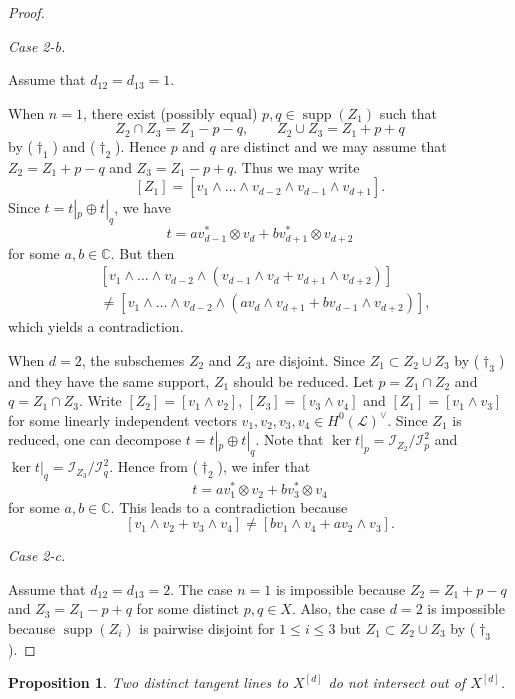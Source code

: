\documentclass[a4paper]{amsart}
\numberwithin{equation}{section}
\theoremstyle{plain}
\newtheorem{prop}[thm]{Proposition}
\theoremstyle{definition}
\theoremstyle{remark}
\numberwithin{figure}{section}
\numberwithin{table}{section}
\numberwithin{equation}{section}
\def \CC {\mathbb{C}}
\def \Ical {\mathcal{I}}
\def \Lcal {\mathcal{L}}
\DeclareMathOperator{\supp}{supp}
\begin{document}
\begin{proof}
\hypertarget{Case2-2-b}{\textit{Case 2-b.}} Assume that $d_{12} = d_{13} = 1$.

When $n = 1$, there exist (possibly equal) $p,q \in \supp(Z_1)$ such that
 \[
  Z_2 \cap Z_3 = Z_1 - p - q, \qquad Z_2 \cup Z_3 = Z_1 + p + q
 \]
by (\hyperlink{dagger1}{$\dagger_1$}) and (\hyperlink{dagger2}{$\dagger_2$}).
Hence $p$ and $q$ are distinct and we may assume that $Z_2 = Z_1 + p - q$ and $Z_3 = Z_1 - p + q$.
Thus we may write
 \[
  [Z_1] = [v_1 \wedge \dots \wedge v_{d-2} \wedge v_{d-1} \wedge v_{d+1}].
 \]
Since $t = t|_p \oplus t|_q$, we have
 \[
  t = av_{d-1}^{\ast} \otimes v_{d} + bv_{d+1}^{\ast} \otimes v_{d+2}
 \]
for some $a,b \in \CC$. But then
 \begin{align*}
  &[v_1 \wedge \dots \wedge v_{d-2} \wedge (v_{d-1} \wedge v_d + v_{d+1} \wedge v_{d+2})] \\
  &\neq [v_1 \wedge \dots \wedge v_{d-2} \wedge (av_d \wedge v_{d+1} + bv_{d-1} \wedge v_{d+2})],
 \end{align*}
which yields a contradiction.

When $d = 2$, the subschemes $Z_2$ and $Z_3$ are disjoint.
Since $Z_1 \subset Z_2 \cup Z_3$ by (\hyperlink{dagger3}{$\dagger_3$}) and they have the same support, $Z_1$ should be reduced.
Let $p = Z_1 \cap Z_2$ and $q = Z_1 \cap Z_3$.
Write $[Z_2] = [v_1 \wedge v_2]$, $[Z_3] = [v_3 \wedge v_4]$ and $[Z_1] = [v_1 \wedge v_3]$ for some linearly independent vectors $v_1, v_2, v_3, v_4 \in H^0(\Lcal)^{\vee}$.
Since $Z_1$ is reduced, one can decompose $t = t|_{p} \oplus t|_{q}$.
Note that $\ker t|_{p} = \Ical_{Z_2}/\Ical_p^2$ and $\ker t|_{q} = \Ical_{Z_3}/\Ical_q^2$.
Hence from (\hyperlink{dagger2}{$\dagger_2$}), we infer that
 \[
  t = av_1^{\ast} \otimes v_2 + bv_3^{\ast} \otimes v_4
 \]
for some $a,b \in \CC$.
This leads to a contradiction because
 \[
  [v_1 \wedge v_2 + v_3 \wedge v_4] \neq [bv_1 \wedge v_4 + av_2 \wedge v_3].
 \]

\hypertarget{Case2-2-c}{\textit{Case 2-c.}} Assume that $d_{12} = d_{13} = 2$.
The case $n = 1$ is impossible because $Z_2 = Z_1 + p - q$ and $Z_3 = Z_1 - p + q$ for some distinct $p,q \in X$.
Also, the case $d = 2$ is impossible because $\supp(Z_i)$ is pairwise disjoint for $1 \leq i \leq 3$ but $Z_1 \subset Z_2 \cup Z_3$ by (\hyperlink{dagger3}{$\dagger_3$}).
\end{proof}


\begin{prop} \label{prop:Tangent-lines-intersect}
    Two distinct tangent lines to $X^{[d]}$ do not intersect out of $X^{[d]}$.
\end{prop}
\end{document}
